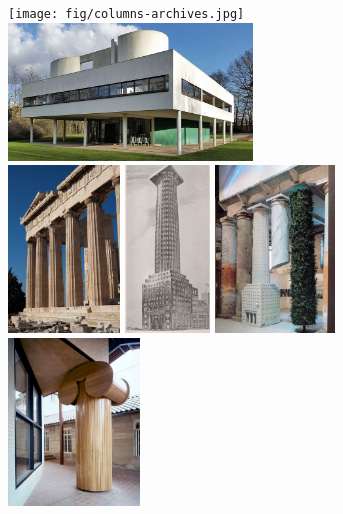 \begin{figure}[t]
\vspace{-1em}
\texttt{[image: fig/columns-archives.jpg]}\quad
\includegraphics[height=9.85em]{fig/columns-savoye.jpg}\quad\\[1em]
\includegraphics[height=12em]{fig/columns-greek.jpg}\quad
\includegraphics[height=12em]{fig/columns-loos.png}\quad
\includegraphics[height=12em]{fig/columns-venice.png}\quad
\includegraphics[height=12em]{fig/columns-venturi.jpg}

\end{figure}
